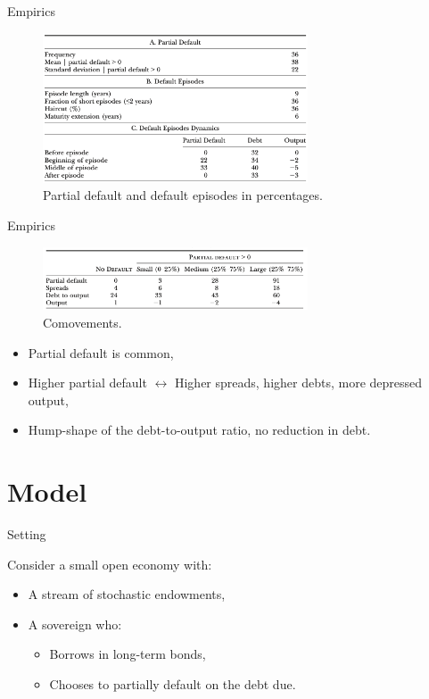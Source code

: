 \documentclass{beamer}
\begin{document}
\begin{frame}{Empirics}

\begin{figure}
\includegraphics[width=0.7\textwidth]{../outputs/tab_1.png}
\caption{Partial default and default episodes in percentages.}
\end{figure}

    
\end{frame}

\begin{frame}{Empirics}

\begin{figure}
    \includegraphics[width=0.7\textwidth]{../outputs/tab_2.png}
    \caption{Comovements.}
\end{figure}
 
\begin{itemize}
    \item Partial default is common,
    \item Higher partial default \(\leftrightarrow\) Higher spreads, higher debts, more depressed output,
    \item Hump-shape of the debt-to-output ratio, no reduction in debt.
\end{itemize}

\end{frame}

\section{Model}

\begin{frame}{Setting}

Consider a small open economy with:
\begin{itemize}
    \item A stream of stochastic endowments,
    \item A sovereign who:
    \begin{itemize}
        \item Borrows in long-term bonds,
        \item Chooses to partially default on the debt due.
    \end{itemize}
\end{itemize} 

\end{frame}
\end{document}
